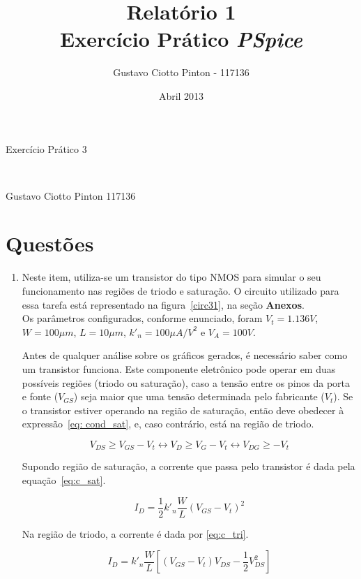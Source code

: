 \documentclass[12pt, a4paper]{article}
\title{Relatório 1\\Exercício Prático \textit{PSpice}}
\author{Gustavo Ciotto Pinton - 117136}
\date{Abril 2013}
\begin{document}
    {\large
    \centerline{Exercício Prático 3}\\
    \centerline{Gustavo Ciotto Pinton 117136}
    }
    \section*{Questões}
    
    \begin{enumerate}
    
        \item Neste item, utiliza-se um transistor do tipo NMOS para simular o seu funcionamento nas regiões de triodo e saturação. O circuito utilizado para essa tarefa está representado na figura~\ref{circ31}, na seção \textbf{Anexos}. \\
        Os parâmetros configurados, conforme enunciado, foram \(V_t = 1.136 V\), \(W = 100 \mu m\), \(L = 10 \mu m\), \(k'_n = 100 \mu A/V^2\) e \(V_A = 100V\).
        
            
        Antes de qualquer análise sobre os gráficos gerados, é necessário saber como um transistor funciona. Este componente eletrônico pode operar em duas possíveis regiões (triodo ou saturação), caso a tensão entre os pinos da porta e fonte (\(V_{GS}\)) seja maior que uma tensão determinada pelo fabricante (\(V_t\)). Se o transistor estiver operando na região de saturação, então deve obedecer à expressão~\ref{eq: cond_sat}, e, caso contrário, está na região de triodo.
        
        \begin{equation} \label{eq: cond_sat}
            V_{DS} \geq V_{GS} - V_t \leftrightarrow V_D \geq V_{G} - V_t \leftrightarrow V_{DG} \geq - V_t
        \end{equation}
        
        Supondo região de saturação, a corrente que passa pelo transistor é dada pela equação~\ref{eq:c_sat}.
        
        \begin{equation} \label{eq:c_sat}
            I_{D} = \frac{1}{2}k'_n\frac{W}{L} (V_{GS} - V_t)^2
        \end{equation}
        
        Na região de triodo, a corrente é dada por \ref{eq:c_tri}.
        
        \begin{equation} \label{eq:c_tri}
            I_{D} = k'_n\frac{W}{L} \left [(V_{GS} - V_t)V_{DS} - \frac{1}{2}V_{DS}^2 \right]
        \end{equation}
        

\end{enumerate}
\end{document}
